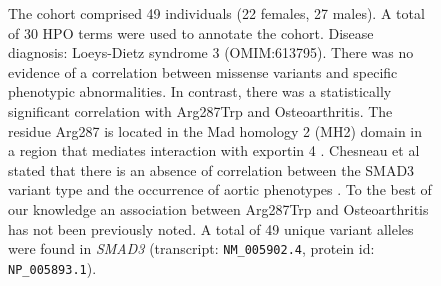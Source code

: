 \begin{figure}[htbp]
\vspace{2em}

\caption{ The cohort comprised 49 individuals (22 females, 27 males). 
A total of 30 HPO terms were used to annotate the cohort. Disease diagnosis: Loeys-Dietz syndrome 3 
(OMIM:613795). There was no evidence of a correlation between missense variants and specific 
phenotypic abnormalities. In contrast, there was a statistically significant correlation with 
Arg287Trp and Osteoarthritis. The residue Arg287 is located in the Mad homology 2 (MH2) domain in a 
region that mediates interaction with exportin 4 \cite{PMID_16449645}. Chesneau et al stated that there is an absence of correlation between the SMAD3 variant type and the occurrence of aortic phenotypes \cite{PMID_32154675}.
To the best of our knowledge an association between Arg287Trp and Osteoarthritis has not been previously noted.
A total of 49 unique variant alleles were found in \textit{SMAD3} (transcript: \texttt{NM\_005902.4}, protein id: \texttt{NP\_005893.1}).}
\end{figure}
